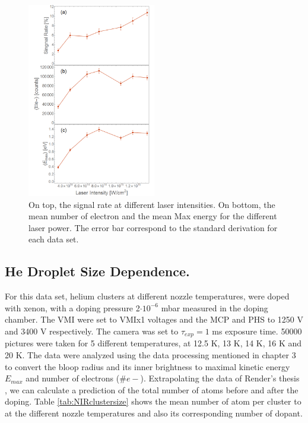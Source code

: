  \begin{figure}[h!]
\centering
\includegraphics[width=0.5\textwidth]{../Images/results/NIR_He_intensityscan/Alltogether.png} 
\caption[NIR He intensity dependence. Signal Rate and Mean Values)]{On top, the signal rate at different laser intensities. On bottom, the mean number of electron and the mean Max energy for the different laser power. The error bar correspond to the standard derivation for each data set.}
\label{fig:NIRHEintall}
\end{figure}



\subsection{He Droplet Size Dependence.}

 For this data set, helium clusters at different nozzle temperatures, were doped with xenon, with a doping pressure 2$\cdot 10^{-6}$ mbar measured in the doping chamber. The VMI were set to VMIx1 voltages and the MCP and PHS to 1250 V and 3400 V respectively. The camera was set to $\tau_{exp}=1$ ms exposure time. 50000 pictures were taken for 5 different temperatures, at 12.5 K, 13 K, 14 K, 16 K and 20 K. The data were analyzed using the data processing mentioned in chapter 3 to convert the bloop radius and its inner brightness to maximal kinetic energy $E_{max}$ and number of electrons ($\#e-$).  Extrapolating the data of Render’s thesis \cite{rendler_einzelschuss_2017}, we can calculate a prediction of the total number of atoms before and after the doping. Table \ref{tab:NIRclustersize} shows the mean number of atom per cluster to at the different nozzle temperatures and also its corresponding number of dopant. 

